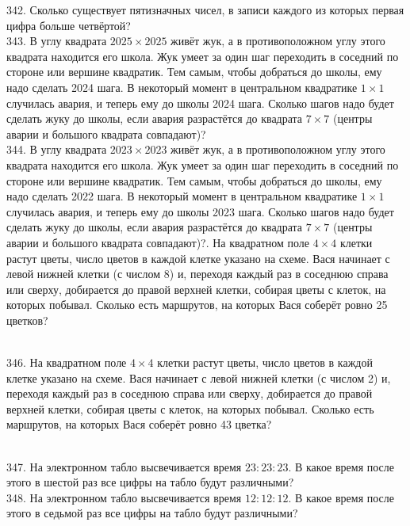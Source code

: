 342. Сколько существует пятизначных чисел, в записи каждого из которых первая цифра больше четвёртой?\\
343. В углу квадрата $2025\times2025$ живёт жук, а в противоположном углу этого квадрата находится его школа. Жук умеет за один шаг переходить в соседний по стороне или вершине квадратик. Тем самым, чтобы добраться до школы, ему надо сделать 2024 шага. В некоторый момент в центральном квадратике $1\times1$ случилась авария, и теперь ему до школы 2024 шага. Сколько шагов надо будет сделать жуку до школы, если авария разрастётся до квадрата $7\times7$ (центры аварии и большого квадрата совпадают)?\\
344. В углу квадрата $2023\times2023$ живёт жук, а в противоположном углу этого квадрата находится его школа. Жук умеет за один шаг переходить в соседний по стороне или вершине квадратик. Тем самым, чтобы добраться до школы, ему надо сделать 2022 шага. В некоторый момент в центральном квадратике $1\times1$ случилась авария, и теперь ему до школы 2023 шага. Сколько шагов надо будет сделать жуку до школы, если авария разрастётся до квадрата $7\times7$ (центры аварии и большого квадрата совпадают)?\newpage{}. На квадратном поле $4\times4$ клетки растут цветы, число цветов в каждой клетке указано на схеме. Вася начинает с левой нижней клетки (с числом 8) и, переходя каждый раз в соседнюю справа или сверху, добирается до правой верхней клетки, собирая цветы с клеток, на которых побывал. Сколько есть маршрутов, на которых Вася соберёт ровно 25 цветков?\\
\begin{figure}[ht!]
\end{figure}\\
346. На квадратном поле $4\times4$ клетки растут цветы, число цветов в каждой клетке указано на схеме. Вася начинает с левой нижней клетки (с числом 2) и, переходя каждый раз в соседнюю справа или сверху, добирается до правой верхней клетки, собирая цветы с клеток, на которых побывал. Сколько есть маршрутов, на которых Вася соберёт ровно 43 цветка?\\
\begin{figure}[ht!]
\end{figure}\\
347. На электронном табло высвечивается время $23:23:23.$ В какое время после этого в шестой раз все цифры на табло будут различными?\\
348. На электронном табло высвечивается время $12:12:12.$ В какое время после этого в седьмой раз все цифры на табло будут различными?\\
